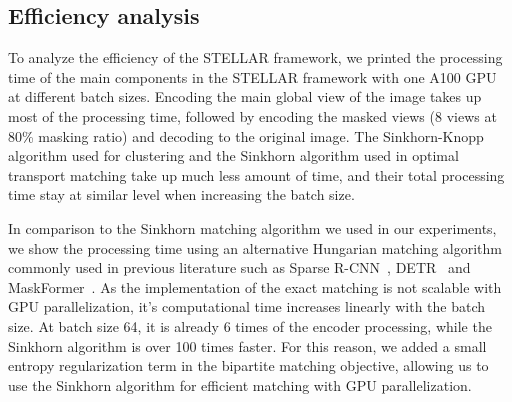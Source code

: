 \subsection{Efficiency analysis}
To analyze the efficiency of the STELLAR framework, we printed the processing time of the main components in the STELLAR framework with one A100 GPU at different batch sizes. Encoding the main global view of the image takes up most of the processing time, followed by encoding the masked views (8 views at 80\% masking ratio) and decoding to the original image. The Sinkhorn-Knopp algorithm used for clustering and the Sinkhorn algorithm used in optimal transport matching take up much less amount of time, and their total processing time stay at similar level when increasing the batch size. 

In comparison to the Sinkhorn matching algorithm we used in our experiments, we show the processing time using an alternative Hungarian matching algorithm commonly used in previous literature such as Sparse R-CNN~\citep{sun2021sparse}, DETR~\citep{carion2020end} and MaskFormer~\citep{cheng2021per}. As the implementation of the exact matching is not scalable with GPU parallelization, it's computational time increases linearly with the batch size. At batch size 64, it is already 6 times of the encoder processing, while the Sinkhorn algorithm is over 100 times faster. For this reason, we added a small entropy regularization term in the bipartite matching objective, allowing us to use the Sinkhorn algorithm for efficient matching with GPU parallelization.


